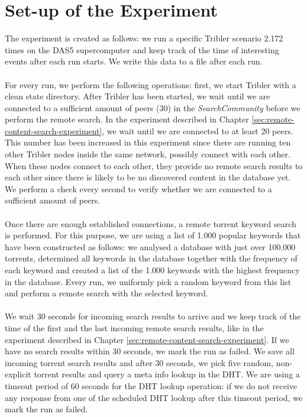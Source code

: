 \section{Set-up of the Experiment}
The experiment is created as follows: we run a specific Tribler scenario 2.172 times on the DAS5 supercomputer and keep track of the time of interesting events after each run starts. We write this data to a file after each run.\\\\
For every run, we perform the following operations: first, we start Tribler with a clean state directory. After Tribler has been started, we wait until we are connected to a sufficient amount of peers (30) in the \emph{SearchCommunity} before we perform the remote search. In the experiment described in Chapter \ref{sec:remote-content-search-experiment}, we wait until we are connected to at least 20 peers. This number has been increased in this experiment since there are running ten other Tribler nodes inside the same network, possibly connect with each other. When these nodes connect to each other, they provide no remote search results to each other since there is likely to be no discovered content in the database yet. We perform a check every second to verify whether we are connected to a sufficient amount of peers.\\\\
Once there are enough established connections, a remote torrent keyword search is performed. For this purpose, we are using a list of 1.000 popular keywords that have been constructed as follows: we analysed a database with just over 100.000 torrents, determined all keywords in the database together with the frequency of each keyword and created a list of the 1.000 keywords with the highest frequency in the database. Every run, we uniformly pick a random keyword from this list and perform a remote search with the selected keyword.\\\\
We wait 30 seconds for incoming search results to arrive and we keep track of the time of the first and the last incoming remote search results, like in the experiment described in Chapter \ref{sec:remote-content-search-experiment}. If we have no search results within 30 seconds, we mark the run as failed. We save all incoming torrent search results and after 30 seconds, we pick five random, non-explicit torrent results and query a meta info lookup in the DHT. We are using a timeout period of 60 seconds for the DHT lookup operation: if we do not receive any response from one of the scheduled DHT lookup after this timeout period, we mark the run as failed.\\\\
